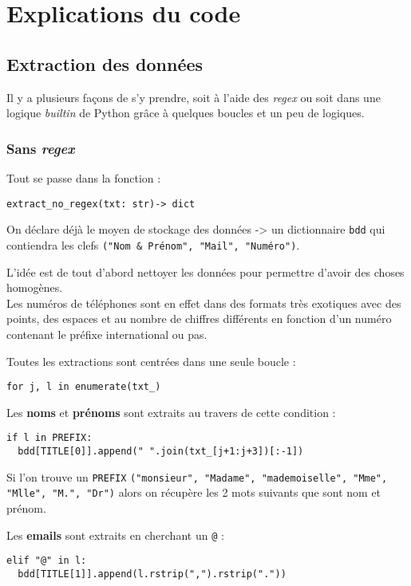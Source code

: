 \documentclass[a4paper,12pt]{article}
\begin{document}
\medskip

\section{Explications du code}
\subsection*{Extraction des données}
Il y a plusieurs façons de s'y prendre, soit à l'aide des \textit{regex} ou soit dans une logique \textit{builtin} de Python grâce à quelques boucles et un peu de logiques.
\subsubsection*{Sans \textit{regex}}
Tout se passe dans la fonction : 
\begin{verbatim}
extract_no_regex(txt: str)-> dict
\end{verbatim}
\medskip

On déclare déjà le moyen de stockage des données -> un dictionnaire \texttt{bdd} qui contiendra les clefs \texttt{("Nom \& Prénom", "Mail", "Numéro")}.
\medskip

L'idée est de tout d'abord nettoyer les données pour permettre d'avoir des choses homogènes. \\
Les numéros de téléphones sont en effet dans des formats très exotiques avec des points, des espaces et au nombre de chiffres différents en fonction d'un numéro contenant le préfixe international ou pas.
\medskip

Toutes les extractions sont centrées dans une seule boucle :
\begin{verbatim}
for j, l in enumerate(txt_)
\end{verbatim}
\medskip

Les \textbf{noms} et \textbf{prénoms} sont extraits au travers de cette condition :
\begin{lstlisting}
if l in PREFIX:
  bdd[TITLE[0]].append(" ".join(txt_[j+1:j+3])[:-1])
\end{lstlisting}
\medskip

Si l'on trouve un \texttt{PREFIX} \texttt{("monsieur", "Madame", "mademoiselle", "Mme", "Mlle", "M.", "Dr")} alors on récupère les 2 mots suivants que sont nom et prénom.
\medskip

Les \textbf{emails} sont extraits en cherchant un \og \texttt{@}\fg{} :
\begin{lstlisting}
elif "@" in l:
  bdd[TITLE[1]].append(l.rstrip(",").rstrip("."))
\end{lstlisting}
\medskip
\end{document}
